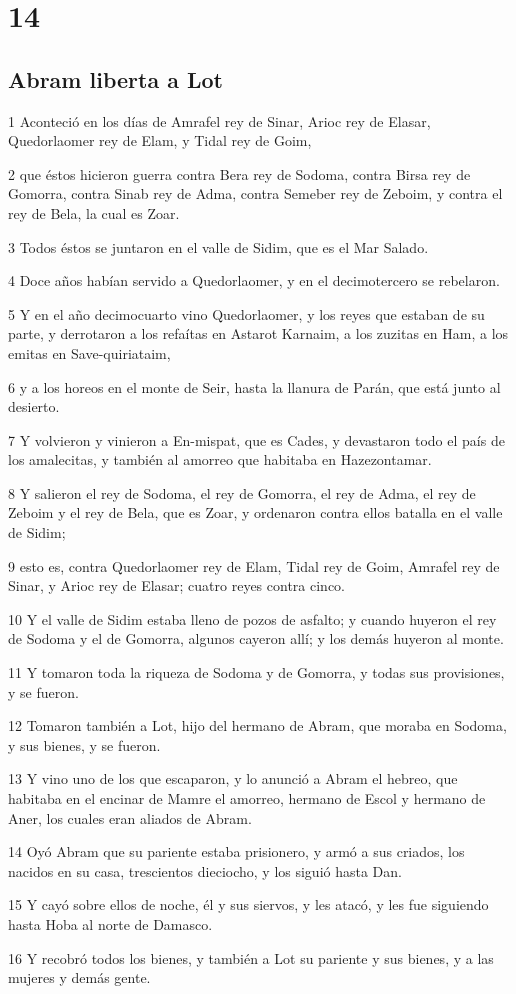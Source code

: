 \chapter{14}

\section*{Abram liberta a Lot}

\par 1 Aconteció en los días de Amrafel rey de Sinar, Arioc rey de Elasar, Quedorlaomer rey de Elam, y Tidal rey de Goim,
\par 2 que éstos hicieron guerra contra Bera rey de Sodoma, contra Birsa rey de Gomorra, contra Sinab rey de Adma, contra Semeber rey de Zeboim, y contra el rey de Bela, la cual es Zoar.
\par 3 Todos éstos se juntaron en el valle de Sidim, que es el Mar Salado.
\par 4 Doce años habían servido a Quedorlaomer, y en el decimotercero se rebelaron.
\par 5 Y en el año decimocuarto vino Quedorlaomer, y los reyes que estaban de su parte, y derrotaron a los refaítas en Astarot Karnaim, a los zuzitas en Ham, a los emitas en Save-quiriataim,
\par 6 y a los horeos en el monte de Seir, hasta la llanura de Parán, que está junto al desierto.
\par 7 Y volvieron y vinieron a En-mispat, que es Cades, y devastaron todo el país de los amalecitas, y también al amorreo que habitaba en Hazezontamar.
\par 8 Y salieron el rey de Sodoma, el rey de Gomorra, el rey de Adma, el rey de Zeboim y el rey de Bela, que es Zoar, y ordenaron contra ellos batalla en el valle de Sidim;
\par 9 esto es, contra Quedorlaomer rey de Elam, Tidal rey de Goim, Amrafel rey de Sinar, y Arioc rey de Elasar; cuatro reyes contra cinco.
\par 10 Y el valle de Sidim estaba lleno de pozos de asfalto; y cuando huyeron el rey de Sodoma y el de Gomorra, algunos cayeron allí; y los demás huyeron al monte.
\par 11 Y tomaron toda la riqueza de Sodoma y de Gomorra, y todas sus provisiones, y se fueron.
\par 12 Tomaron también a Lot, hijo del hermano de Abram, que moraba en Sodoma, y sus bienes, y se fueron.
\par 13 Y vino uno de los que escaparon, y lo anunció a Abram el hebreo, que habitaba en el encinar de Mamre el amorreo, hermano de Escol y hermano de Aner, los cuales eran aliados de Abram.
\par 14 Oyó Abram que su pariente estaba prisionero, y armó a sus criados, los nacidos en su casa, trescientos dieciocho, y los siguió hasta Dan.
\par 15 Y cayó sobre ellos de noche, él y sus siervos, y les atacó, y les fue siguiendo hasta Hoba al norte de Damasco.
\par 16 Y recobró todos los bienes, y también a Lot su pariente y sus bienes, y a las mujeres y demás gente.

